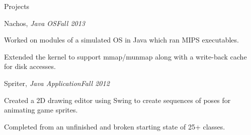 \documentclass{resume} %
\begin{document}
\begin{rSection}{Projects}
\begin{rSubsection}{Nachos, {\em Java OS}}{{\em Fall 2013}}{}{}
\item Worked on modules of a simulated OS in Java which ran MIPS executables.
\item Extended the kernel to support mmap/munmap along with a write-back cache for disk accesses.
\end{rSubsection}

\begin{rSubsection}{Spriter, {\em Java Application}}{{\em Fall 2012}}{}{}
\item Created a 2D drawing editor using Swing to create sequences of poses for animating game sprites.
\item Completed from an unfinished and broken starting state of 25+ classes.
\end{rSubsection}


\end{rSection}



\end{document}
